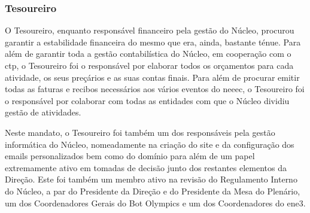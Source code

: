 
\subsubsection{Tesoureiro}

O Tesoureiro, enquanto responsável financeiro pela gestão do Núcleo, procurou garantir a estabilidade financeira do mesmo que era, ainda, bastante ténue. Para além de garantir toda a gestão contabilística do Núcleo, em cooperação com o \acrshort{ctp}, o Tesoureiro foi o responsável por elaborar todos os orçamentos para cada atividade, os seus preçários e as suas contas finais. Para além de procurar emitir todas as faturas e recibos necessários aos vários eventos do \acrshort{neeec}, o Tesoureiro foi o responsável por colaborar com todas as entidades com que o Núcleo dividiu gestão de atividades.

Neste mandato, o Tesoureiro foi também um dos responsáveis pela gestão informática do Núcleo, nomeadamente na criação do site e da configuração dos emails personalizados bem como do domínio para além de um papel extremamente ativo em tomadas de decisão junto dos restantes elementos da Direção. Este foi também um membro ativo na revisão do Regulamento Interno do Núcleo, a par do Presidente da Direção e do Presidente da Mesa do Plenário, um dos Coordenadores Gerais do Bot Olympics e um dos Coordenadores do \acrshort{ene3}.